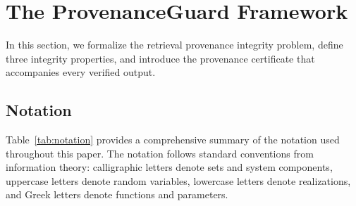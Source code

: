 \documentclass[journal,10pt]{IEEEtran}
\begin{document}
\section{The ProvenanceGuard Framework}\label{sec:framework}

In this section, we formalize the retrieval provenance integrity problem, define three integrity properties, and introduce the provenance certificate that accompanies every verified output.

\subsection{Notation}
Table~\ref{tab:notation} provides a comprehensive summary of the notation used throughout this paper. The notation follows standard conventions from information theory: calligraphic letters denote sets and system components, uppercase letters denote random variables, lowercase letters denote realizations, and Greek letters denote functions and parameters.
\end{document}
